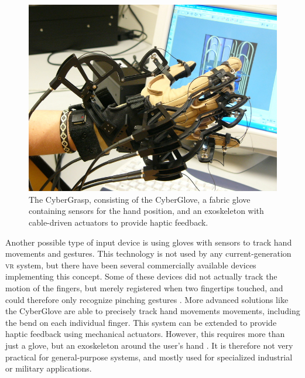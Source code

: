 \documentclass[nobib]{tufte-book} %
\begin{document}
\begin{figure}
  \includegraphics{cybergrasp.jpg}
  \caption{The CyberGrasp, consisting of the CyberGlove, a fabric glove containing sensors for the hand position, and an exoskeleton with cable-driven actuators to provide haptic feedback.}
  \label{fig:cybergrasp}
\end{figure}


Another possible type of input device is using gloves with sensors to track hand movements and gestures. This technology is not used by any current-generation \textsc{vr} system, but there have been several commercially available devices implementing this concept. Some of these devices did not actually track the motion of the fingers, but merely registered when two fingertips touched, and could therefore only recognize pinching gestures \cite{bowman2001pinchgloves}. More advanced solutions like the CyberGlove are able to precisely track hand movements movements, including the bend on each individual finger. This system can be extended to provide haptic feedback using mechanical actuators. However, this requires more than just a glove, but an exoskeleton around the user's hand \cite{bar2003haptic}. It is therefore not very practical for general-purpose systems, and mostly used for specialized industrial or military applications.
\end{document}
